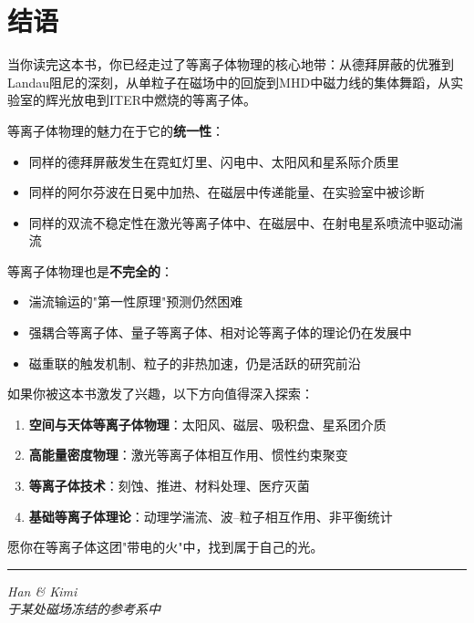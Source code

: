 \documentclass[12pt,a4paper,openany,oneside]{book}
\begin{document}
\newpage

\chapter*{结语}

当你读完这本书，你已经走过了等离子体物理的核心地带：从德拜屏蔽的优雅到Landau阻尼的深刻，从单粒子在磁场中的回旋到MHD中磁力线的集体舞蹈，从实验室的辉光放电到ITER中燃烧的等离子体。

等离子体物理的魅力在于它的\textbf{统一性}：
\begin{itemize}
\item 同样的德拜屏蔽发生在霓虹灯里、闪电中、太阳风和星系际介质里
\item 同样的阿尔芬波在日冕中加热、在磁层中传递能量、在实验室中被诊断
\item 同样的双流不稳定性在激光等离子体中、在磁层中、在射电星系喷流中驱动湍流
\end{itemize}

等离子体物理也是\textbf{不完全的}：
\begin{itemize}
\item 湍流输运的"第一性原理"预测仍然困难
\item 强耦合等离子体、量子等离子体、相对论等离子体的理论仍在发展中
\item 磁重联的触发机制、粒子的非热加速，仍是活跃的研究前沿
\end{itemize}

如果你被这本书激发了兴趣，以下方向值得深入探索：
\begin{enumerate}
\item \textbf{空间与天体等离子体物理}：太阳风、磁层、吸积盘、星系团介质
\item \textbf{高能量密度物理}：激光等离子体相互作用、惯性约束聚变
\item \textbf{等离子体技术}：刻蚀、推进、材料处理、医疗灭菌
\item \textbf{基础等离子体理论}：动理学湍流、波--粒子相互作用、非平衡统计
\end{enumerate}

愿你在等离子体这团"带电的火"中，找到属于自己的光。

\vspace{2em}
\noindent\rule{\textwidth}{0.4pt}
\vspace{1em}

\begin{flushright}
\textit{Han \& Kimi}\\
\textit{于某处磁场冻结的参考系中}
\end{flushright}
\end{document}
